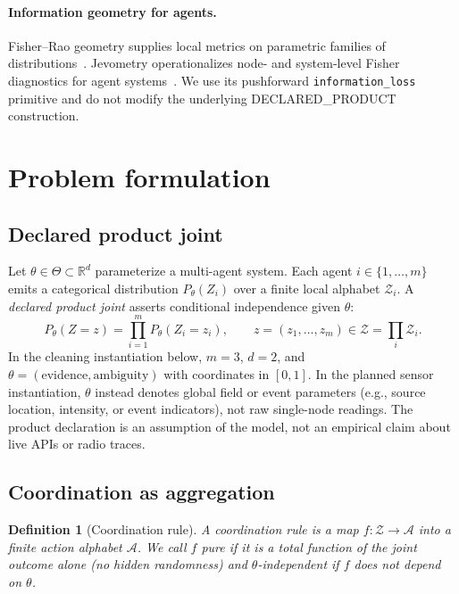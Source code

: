 \documentclass[11pt,a4paper]{article}
\newtheorem{definition}{Definition}
\begin{document}
\paragraph{Information geometry for agents.}
Fisher--Rao geometry supplies local metrics on parametric families of
distributions~\citep{amari2016information}. Jevometry operationalizes node-
and system-level Fisher diagnostics for agent
systems~\citep{jevometry2026}. We use its pushforward
\texttt{information\_loss} primitive and do not modify the underlying
DECLARED\_PRODUCT construction.

\section{Problem formulation}
\label{sec:problem}

\subsection{Declared product joint}

Let $\theta\in\Theta\subset\mathbb{R}^d$ parameterize a multi-agent system.
Each agent $i\in\{1,\ldots,m\}$ emits a categorical distribution
$P_\theta(Z_i)$ over a finite local alphabet $\mathcal{Z}_i$. A
\emph{declared product joint} asserts conditional independence given
$\theta$:
\begin{equation}
  P_\theta(Z=z)=\prod_{i=1}^{m} P_\theta(Z_i=z_i),
  \qquad z=(z_1,\ldots,z_m)\in\mathcal{Z}=\prod_i\mathcal{Z}_i.
\end{equation}
In the cleaning instantiation below, $m=3$, $d=2$, and
$\theta=(\mathrm{evidence},\mathrm{ambiguity})$ with coordinates in
$[0,1]$. In the planned sensor instantiation, $\theta$ instead denotes
global field or event parameters (e.g., source location, intensity, or
event indicators), not raw single-node readings. The product declaration is
an assumption of the model, not an empirical claim about live APIs or radio
traces.

\subsection{Coordination as aggregation}

\begin{definition}[Coordination rule]
A coordination rule is a map $f:\mathcal{Z}\to\mathcal{A}$ into a finite
action alphabet $\mathcal{A}$. We call $f$ \emph{pure} if it is a total
function of the joint outcome alone (no hidden randomness) and
\emph{$\theta$-independent} if $f$ does not depend on $\theta$.
\end{definition}
\end{document}
